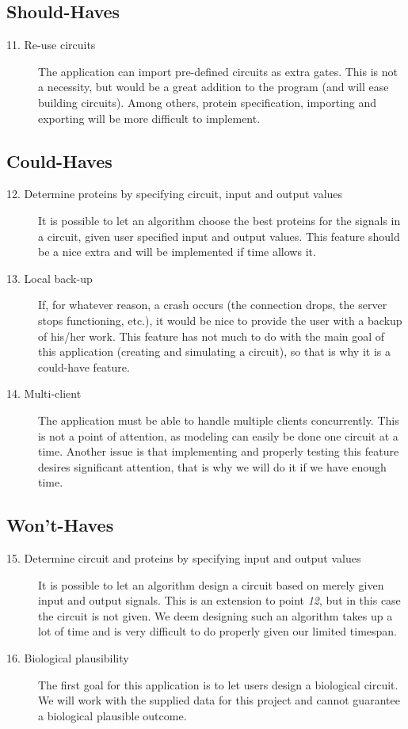 \documentclass[a4paper]{article}
\begin{document}
\subsection{Should-Haves}
\begin{description}
\item[11. Re-use circuits] The application can import pre-defined circuits as extra gates. This is not a necessity, but would be a great addition to the program (and will ease building circuits). Among others, protein specification, importing and exporting will be more difficult to implement.
\end{description}

\subsection{Could-Haves}
\begin{description}
\item[12. Determine proteins by specifying circuit, input and output values] It is possible to let an algorithm choose the best proteins for the signals in a circuit, given user specified input and output values. This feature should be a nice extra and will be implemented if time allows it.
\item[13. Local back-up] If, for whatever reason, a crash occurs (the connection drops, the server stops functioning, etc.), it would be nice to provide the user with a backup of his/her work. This feature has not much to do with the main goal of this application (creating and simulating a circuit), so that is why it is a could-have feature.
\item[14. Multi-client] The application must be able to handle multiple clients concurrently. This is not a point of attention, as modeling can easily be done one circuit at a time. Another issue is that implementing and properly testing this feature desires significant attention, that is why we will do it if we have enough time.
\end{description}

\subsection{Won't-Haves}
\begin{description}
\item[15. Determine circuit and proteins by specifying input and output values] It is possible to let an algorithm design a circuit based on merely given input and output signals. This is an extension to point \emph{12}, but in this case the circuit is not given. We deem designing such an algorithm takes up a lot of time and is very difficult to do properly given our limited timespan.
\item[16. Biological plausibility] The first goal for this application is to let users design a biological circuit. We will work with the supplied data for this project and cannot guarantee a biological plausible outcome.
\end{description}
\end{document}
